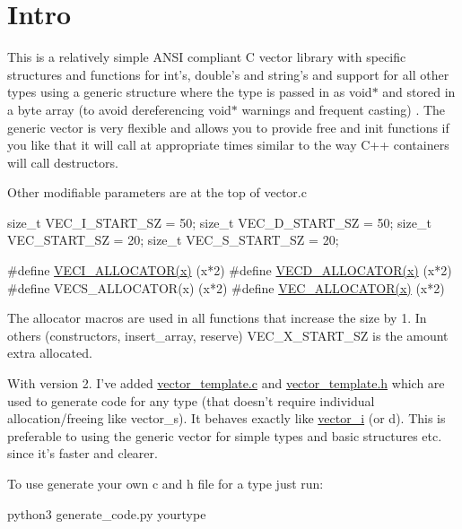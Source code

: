 \hypertarget{index_Intro}{}\section{\-Intro}\label{index_Intro}
\-This is a relatively simple \-A\-N\-S\-I compliant \-C vector library with specific structures and functions for int's, double's and string's and support for all other types using a generic structure where the type is passed in as void$\ast$ and stored in a byte array (to avoid dereferencing void$\ast$ warnings and frequent casting) . \-The generic vector is very flexible and allows you to provide free and init functions if you like that it will call at appropriate times similar to the way \-C++ containers will call destructors.

\-Other modifiable parameters are at the top of vector.\-c 
\begin{DoxyPre}
size\_t VEC\_I\_START\_SZ = 50;
size\_t VEC\_D\_START\_SZ = 50;
size\_t VEC\_START\_SZ = 20;
size\_t VEC\_S\_START\_SZ = 20;\end{DoxyPre}



\begin{DoxyPre}#define \hyperlink{vectori_8c_a88db9d722845b6a23eb29d044a0a3c98}{VECI\_ALLOCATOR(x)} (x*2)
#define \hyperlink{vectord_8c_af2c425102d9020ae35b894de0c7eadea}{VECD\_ALLOCATOR(x)} (x*2)
#define VECS\_ALLOCATOR(x) (x*2)
#define \hyperlink{vector__void_8c_acc6ff7ec59b6544f657758f724fb7a8b}{VEC\_ALLOCATOR(x)} (x*2)
\end{DoxyPre}
 \-The allocator macros are used in all functions that increase the size by 1. \-In others (constructors, insert\-\_\-array, reserve) \-V\-E\-C\-\_\-\-X\-\_\-\-S\-T\-A\-R\-T\-\_\-\-S\-Z is the amount extra allocated.

\-With version 2. \-I've added \hyperlink{vector__template_8c}{vector\-\_\-template.\-c} and \hyperlink{vector__template_8h}{vector\-\_\-template.\-h} which are used to generate code for any type (that doesn't require individual allocation/freeing like vector\-\_\-s). \-It behaves exactly like \hyperlink{structvector__i}{vector\-\_\-i} (or d). \-This is preferable to using the generic vector for simple types and basic structures etc. since it's faster and clearer.

\-To use generate your own c and h file for a type just run\-: 
\begin{DoxyPre}
python3 generate\_code.py yourtype
\end{DoxyPre}


